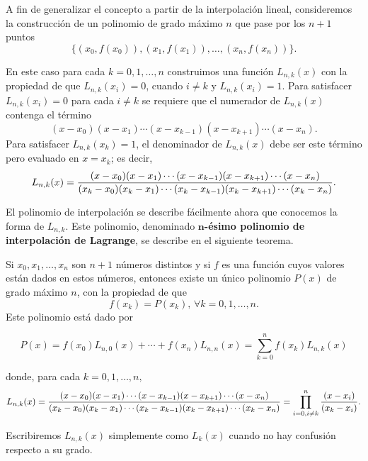 A fin de generalizar el concepto a partir de la interpolación lineal, consideremos la construcción de un polinomio de grado máximo $n$ 
que pase por los $n+1$ puntos
$$\{(x_0, f(x_0)), (x_1, f(x_1)), \dots ,(x_n, f(x_n))\}.$$

En este caso para cada $k=0,1, \dots , n$ construimos una función $L_{n,k}(x)$ con la propiedad de que $L_{n,k}(x_i) = 0$, 
cuando $i\not= k$ y $L_{n,k}(x_i) = 1$.
Para satisfacer $L_{n,k}(x_i) = 0$ para cada $i\not= k$ se requiere que el numerador de $L_{n,k}(x)$ contenga el término
$$(x-x_0)(x-x_1)\cdots (x-x_{k-1})(x-x_{k+1})\cdots (x-x_n).$$
Para satisfacer $L_{n,k}(x_k) = 1$, el denominador de $L_{n,k}(x)$ debe ser este término pero evaluado en $x=x_k$; es decir,
$$L_{n,k}(x) = {(x-x_0)(x-x_1)\cdots (x-x_{k-1})(x-x_{k+1})\cdots (x-x_n) \over (x_k-x_0)(x_k-x_1)\cdots (x_k-x_{k-1})(x_k-x_{k+1})\cdots (x_k-x_n)}.$$

El polinomio de interpolación se describe fácilmente ahora que conocemos la forma de $L_{n,k}$. Este polinomio, denominado 
\textbf{$\textbf{n}$-ésimo polinomio de interpolación de Lagrange}, se describe en el siguiente teorema.

\begin{theorem}
	Si $x_0, x_1, \dots , x_n$ son $n+1$ números distintos y si $f$ es una función cuyos valores están dados en estos números, entonces existe 
	un único polinomio $P(x)$ de grado máximo $n$, con la propiedad de que
	$$f(x_k) = P(x_k),\, \forall k=0,1,\dots , n.$$	
	Este polinomio está dado por
	
	\begin{equation}
		P(x) = f(x_0)L_{n,0}(x) + \cdots + f(x_n)L_{n,n}(x) = \sum_{k=0}^n f(x_k)L_{n,k}(x)
		\label{eq:polinomioLagrange}
	\end{equation}
	
	donde, para cada $k=0,1,\dots , n,$
	\begin{equation}
		L_{n,k}(x) = {(x-x_0)(x-x_1)\cdots (x-x_{k-1})(x-x_{k+1})\cdots (x-x_n) \over (x_k-x_0)(x_k-x_1)\cdots (x_k-x_{k-1})(x_k-x_{k+1})\cdots (x_k-x_n)} \\
		= \prod_{i=0, i\not= k}^{n} {(x-x_i) \over (x_k - x_i)}. 
		\label{eq:coeficientesLagrange}
	\end{equation}
\end{theorem}

Escribiremos $L_{n,k}(x)$ simplemente como $L_{k}(x)$ cuando no hay confusión respecto a su grado.

